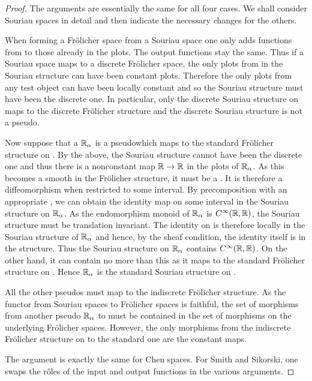 \documentclass[%
a4paper,%
arxiv,%
defaults
]{myclass}
\begin{document}
\begin{proof}
The arguments are essentially the same for all four cases.
We shall consider Souriau spaces in detail and then indicate the necessary changes for the others.

When forming a Fr\"olicher space from a Souriau space one only adds functions from \R to those already in the plots.
The output functions stay the same.
Thus if a Souriau space maps to a discrete Fr\"olicher space, the only plots from \R in the Souriau structure can have been constant plots.
Therefore the only plots from any test object can have been locally constant and so the Souriau structure must have been the discrete one.
In particular, only the discrete Souriau structure on \R maps to the discrete Fr\"olicher structure and the discrete Souriau structure is not a pseudo\enhyp{}\R.

Now suppose that a \(\mathbb{R}_\alpha\) is a pseudo\enhyp{}\R which maps to the standard Fr\"olicher structure on \R.
By the above, the Souriau structure cannot have been the discrete one and thus there is a non\enhyp{}constant map \(\mathbb{R} \to \mathbb{R}\) in the plots of \(\mathbb{R}_\alpha\).
As this becomes a smooth in the Fr\"olicher structure, it must be a \cimap.
It is therefore a diffeomorphism when restricted to some interval.
By precomposition with an appropriate \cimap, we can obtain the identity map on some interval in the Souriau structure on \(\mathbb{R}_\alpha\).
As the endomorphism monoid of \(\mathbb{R}_\alpha\) is \(C^\infty(\mathbb{R},\mathbb{R})\), the Souriau structure must be translation invariant.
The identity on \R is therefore locally in the Souriau structure of \(\mathbb{R}_\alpha\) and hence, by the sheaf condition, the identity itself is in the structure.
Thus the Souriau structure on \(\mathbb{R}_\alpha\) contains \(C^\infty(\mathbb{R},\mathbb{R})\).
On the other hand, it can contain no more than this as it maps to the standard Fr\"olicher structure on \R.
Hence \(\mathbb{R}_\alpha\) is the standard Souriau structure on \R.

All the other pseudo\enhyp{}\R{}s must map to the indiscrete Fr\"olicher structure.
As the functor from Souriau spaces to Fr\"olicher spaces is faithful, the set of morphisms from another pseudo\enhyp{}\R{} \(\mathbb{R}_\alpha\) to \R must be contained in the set of morphisms on the underlying Fr\"olicher spaces.
However, the only morphisms from the indiscrete Fr\"olicher structure on \R to the standard one are the constant maps.

The argument is exactly the same for Chen spaces.
For Smith and Sikorski, one swaps the r\^oles of the input and output functions in the various arguments.
\end{proof}
\end{document}
